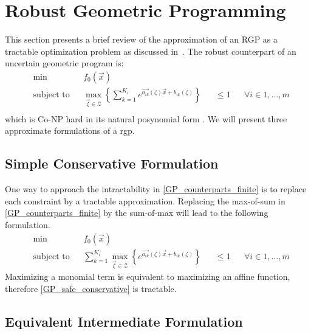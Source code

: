 \section{Robust Geometric Programming} \label{RGP}

This section presents a brief review of the approximation of an RGP as a
tractable optimization problem as discussed in~\cite{Saab2018}.
The robust counterpart of an uncertain geometric program is:
\begin{equation}
\begin{aligned}
& \min &&f_0\left(\vec{x}\right)\\
& \text{subject to} &&\max_{\vec{\zeta} \in \mathcal{Z}} \left\{\textstyle{\sum}_{k=1}^{K_i}e^{\vec{a_{ik}}\left(\zeta\right)\vec{x} + b_{ik}\left(\zeta\right)}\right\} &&\leq 1 &&\forall i \in 1,...,m\\
\end{aligned}
\label{GP_counterparts_finite}
\end{equation}
which is Co-NP hard in its natural posynomial form \cite{RGPcoNP}. We will present three approximate formulations of a \gls{rgp}.

\subsection{Simple Conservative Formulation}
One way to approach the intractability in \eqref{GP_counterparts_finite} is to replace each constraint by a tractable approximation.
Replacing the max-of-sum in \eqref{GP_counterparts_finite} by the sum-of-max will lead to the following formulation.
\begin{equation}
\begin{aligned}
& \min &&f_0\left(\vec{x}\right)\\
& \text{subject to} &&\textstyle{\sum}_{k=1}^{K_i} {\displaystyle \max_{\vec{\zeta} \in \mathcal{Z}}} \left\{e^{\vec{a_{ik}}\left(\zeta\right)\vec{x} + b_{ik}\left(\zeta\right)}\right\} &&\leq 1 &&\forall i \in 1,...,m
\end{aligned}
\label{GP_safe_conservative}
\end{equation}
Maximizing a monomial term is equivalent to maximizing an affine function, therefore \eqref{GP_safe_conservative} is tractable.

\subsection{Equivalent Intermediate Formulation}

